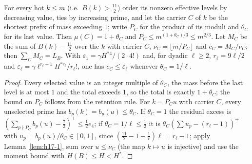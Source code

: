 \begin{lemma}\label{lem:h17-5}
For every hot $k\le m$ (i.e.\ $B(k)>\tfrac{11}2$) order its nonzero effective levels by decreasing value, ties by increasing
prime, and let the carrier $C$ of $k$ be the shortest prefix of mass exceeding $1$; write $P_C$ for the product of its moduli
and $\theta_C$ for its last value. Then $\mu(C)=1+\theta_C$ and $P_C\le m^{(1+\theta_C)/3}\le m^{2/3}$. Let $M_C$ be the sum of
$B(k)-\tfrac{11}2$ over the $k$ with carrier $C$, $\nu_C=\lfloor m/P_C\rfloor$ and $c_C=M_C/\nu_C$; then $\sum_CM_C=L_B$. With
$\varepsilon_1=\gamma H^{*4}/(2\cdot4!)$ and, for dyadic $\ell\ge2$, $r_\ell=9\ell/2$ and
$\varepsilon_\ell=\gamma\ell^{r_\ell-1}H^{*r_\ell}/r_\ell!$, one has $c_C\le\varepsilon_\ell$ whenever $\theta_C=1/\ell$.
\end{lemma}
\begin{proof}
Every selected value is an integer multiple of $\theta_C$, the mass before the last level is at most $1$ and the total exceeds
$1$, so the total is exactly $1+\theta_C$; the bound on $P_C$ follows from the retention rule. For $k=P_Cu$ with carrier $C$,
every unselected prime has $b_p(k)=b_p(u)\le\theta_C$. If $\theta_C=1$ the residual excess is
$(\sum_{p\nmid P_C}b_p(u)-\tfrac72)^+\le\tfrac12e_4$; if $\theta_C=1/\ell\le\tfrac12$ it is $\theta_C(\sum u_p-(r_\ell-1))^+$
with $u_p=b_p(u)/\theta_C\in[0,1]$, since $(\tfrac{11}2-1-\tfrac1\ell)\ell=r_\ell-1$; apply Lemma~\ref{lem:h17-1}, sum over
$u\le\nu_C$ (the map $k\mapsto u$ is injective) and use the moment bound with $H(B)\le H<H^*$.
\end{proof}

